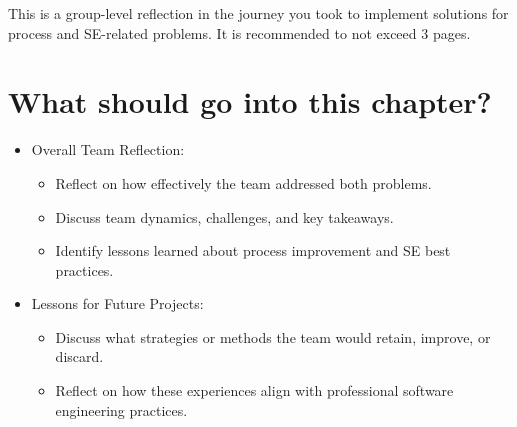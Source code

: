 

\noindent This is a group-level reflection in the journey you took to implement solutions for process and SE-related problems. It is recommended to not exceed 3 pages.

\section{What should go into this chapter?}

\begin{itemize}

    \item [-] Overall Team Reflection:

    \begin{itemize}
        \item Reflect on how effectively the team addressed both problems.
        \item Discuss team dynamics, challenges, and key takeaways.
        \item Identify lessons learned about process improvement and SE best practices.
    \end{itemize}

    \item [-] Lessons for Future Projects:

    \begin{itemize}
        \item Discuss what strategies or methods the team would retain, improve, or discard.
        \item Reflect on how these experiences align with professional software engineering practices.
    \end{itemize}


\end{itemize}